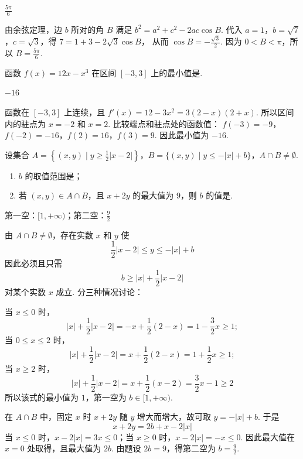 \begin{answer}
\(\frac{5\pi}{6}\)
\end{answer}

\begin{solution}
由余弦定理，边 \(b\) 所对的角 \(B\) 满足 \(b^2=a^2+c^2-2ac\cos B\). 代入 \(a=1\)，\(b=\sqrt7\)，\(c=\sqrt3\)，得 \(7=1+3-2\sqrt3\cos B\)，
从而 \(\cos B=-\frac{\sqrt3}{2}\). 因为 \(0<B<\pi\)，所以 \(B=\frac{5\pi}{6}\).
\end{solution}

\begin{problem}
函数 \( f(x) = 12x - x^3 \) 在区间 \([-3, 3]\) 上的最小值是\fillinblank{}.
\end{problem}

\begin{answer}
\(-16\)
\end{answer}

\begin{solution}
函数在 \([-3,3]\) 上连续，且 \(f'(x)=12-3x^2=3(2-x)(2+x)\).
所以区间内的驻点为 \(x=-2\) 和 \(x=2\). 比较端点和驻点处的函数值：
\(f(-3)=-9\)，\(f(-2)=-16\)，\(f(2)=16\)，\(f(3)=9\).
因此最小值为 \(-16\).
\end{solution}

\begin{problem}
设集合 \(A = \left\{(x, y) \mid y \geqslant \frac{1}{2} |x - 2|\right\}\)，\(B = \{(x, y) \mid y \leqslant -|x| + b\}\)，\(A \cap B \neq \emptyset\).

\begin{enumerate}
\item \(b\) 的取值范围是\fillinblank{}；
\item 若 \( (x, y) \in A \cap B \)，且 \( x + 2y \) 的最大值为 \(9\)，则 \(b\) 的值是\fillinblank{}.
\end{enumerate}
\end{problem}

\begin{answer}
第一空：\([1,+\infty)\)；第二空：\(\frac{9}{2}\)
\end{answer}

\begin{solution}
由 \(A\cap B\neq\emptyset\)，存在实数 \(x\) 和 \(y\) 使
\[
\frac{1}{2}|x-2|\leqslant y\leqslant -|x|+b
\]
因此必须且只需
\[
b\geqslant |x|+\frac{1}{2}|x-2|
\]
对某个实数 \(x\) 成立. 分三种情况讨论：

当 \(x\leqslant0\) 时，
\[
|x|+\frac{1}{2}|x-2|=-x+\frac{1}{2}(2-x)=1-\frac{3}{2}x\geqslant1;
\]
当 \(0\leqslant x\leqslant2\) 时，
\[
|x|+\frac{1}{2}|x-2|=x+\frac{1}{2}(2-x)=1+\frac{1}{2}x\geqslant1;
\]
当 \(x\geqslant2\) 时，
\[
|x|+\frac{1}{2}|x-2|=x+\frac{1}{2}(x-2)=\frac{3}{2}x-1\geqslant2
\]
所以该式的最小值为 \(1\)，第一空为 \(b\in[1,+\infty)\).

在 \(A\cap B\) 中，固定 \(x\) 时 \(x+2y\) 随 \(y\) 增大而增大，故可取 \(y=-|x|+b\). 于是
\[
x+2y=2b+x-2|x|
\]
当 \(x\leqslant0\) 时，\(x-2|x|=3x\leqslant0\)；当 \(x\geqslant0\) 时，\(x-2|x|=-x\leqslant0\). 因此最大值在 \(x=0\) 处取得，且最大值为 \(2b\). 由题设 \(2b=9\)，得第二空为 \(b=\frac{9}{2}\).
\end{solution}

